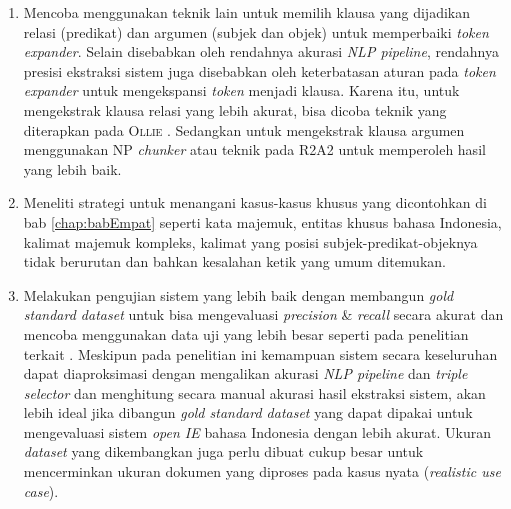 \begin{enumerate}
	\item Mencoba menggunakan teknik lain untuk memilih klausa yang dijadikan relasi (predikat) dan argumen (subjek dan objek) untuk memperbaiki \textit{token expander}. Selain disebabkan oleh rendahnya akurasi \textit{NLP pipeline}, rendahnya presisi ekstraksi sistem juga disebabkan oleh keterbatasan aturan pada \textit{token expander} untuk mengekspansi \textit{token} menjadi klausa. Karena itu, untuk mengekstrak klausa relasi yang lebih akurat, bisa dicoba teknik yang diterapkan pada \textsc{Ollie} \citep{schmitz2012open}. Sedangkan untuk mengekstrak klausa argumen menggunakan NP \textit{chunker} atau teknik pada \textsc{R2A2} \citep{etzioni2011open} untuk memperoleh hasil yang lebih baik.
	
	\item Meneliti strategi untuk menangani kasus-kasus khusus yang dicontohkan di bab \ref{chap:babEmpat} seperti kata majemuk, entitas khusus bahasa Indonesia, kalimat majemuk kompleks, kalimat yang posisi subjek-predikat-objeknya tidak berurutan dan bahkan kesalahan ketik yang umum ditemukan.
	
	\item Melakukan pengujian sistem yang lebih baik dengan membangun \textit{gold standard dataset} untuk bisa mengevaluasi \textit{precision} \& \textit{recall} secara akurat dan mencoba menggunakan data uji yang lebih besar seperti pada penelitian terkait \citep{banko2007open}. Meskipun pada penelitian ini kemampuan sistem secara keseluruhan dapat diaproksimasi dengan mengalikan akurasi \textit{NLP pipeline} dan \textit{triple selector} dan menghitung secara manual akurasi hasil ekstraksi sistem, akan lebih ideal jika dibangun \textit{gold standard dataset} yang dapat dipakai untuk mengevaluasi sistem \textit{open IE} bahasa Indonesia dengan lebih akurat. Ukuran \textit{dataset} yang dikembangkan juga perlu dibuat cukup besar untuk mencerminkan ukuran dokumen yang diproses pada kasus nyata (\textit{realistic use case}).
	
\end{enumerate}
